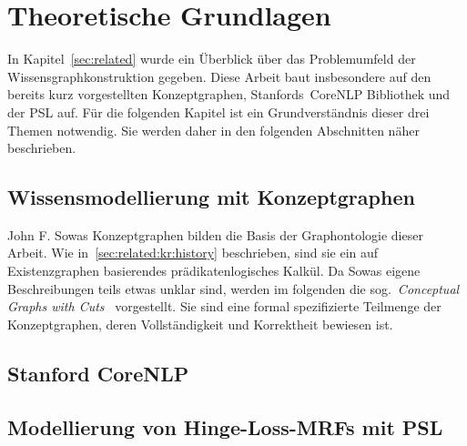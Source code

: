 %
\chapter{Theoretische Grundlagen}
\label{sec:theory}

In Kapitel~\ref{sec:related} wurde ein Überblick über das Problemumfeld der Wissensgraphkonstruktion gegeben.
Diese Arbeit baut insbesondere auf den bereits kurz vorgestellten Konzeptgraphen, Stanfords~CoreNLP Bibliothek und der PSL auf.
Für die folgenden Kapitel ist ein Grundverständnis dieser drei Themen notwendig.
Sie werden daher in den folgenden Abschnitten näher beschrieben.

\section{Wissensmodellierung mit Konzeptgraphen}
\label{sec:theory:cg}

John F. Sowas Konzeptgraphen bilden die Basis der Graphontologie dieser Arbeit.
Wie in~\ref{sec:related:kr:history} beschrieben, sind sie ein auf Existenzgraphen basierendes prädikatenlogisches Kalkül.
Da Sowas eigene Beschreibungen teils etwas unklar sind, werden im folgenden die sog.~\textit{Conceptual Graphs with Cuts}~\cite{Dau2003} vorgestellt.
Sie sind eine formal spezifizierte Teilmenge der Konzeptgraphen, deren Vollständigkeit und Korrektheit bewiesen ist.

\section{Stanford CoreNLP}
\label{sec:theory:nlp}

\section{Modellierung von Hinge-Loss-MRFs mit PSL}
\label{sec:theory:psl}
